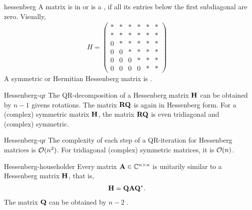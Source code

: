 \begin{Definition}{hessenberg}
  A matrix is in  or is a , if all its entries below the first subdiagonal are zero. Visually,
  \begin{gather}
    H = 
    \begin{pmatrix}
      *&*&*&*&*&*\\
      *&*&*&*&*&*\\
      0&*&*&*&*&*\\
      0&0&*&*&*&*\\
      0&0&0&*&*&*\\
      0&0&0&0&*&*
    \end{pmatrix}
  \end{gather}
  A symmetric or Hermitian Hessenberg matrix is .
\end{Definition}

\begin{Theorem}{Hessenberg-qr}
  The QR-decomposition of a Hessenberg matrix $\mathbf H$ can be obtained
  by $n-1$ givens rotations. The matrix $\mathbf R\mathbf Q$ is again in
  Hessenberg form. For a (complex) symmetric matrix $\mathbf H$, the
  matrix $\mathbf R\mathbf Q$ is even tridiagonal and (complex) symmetric.
\end{Theorem}

\begin{Corollary}{Hessenberg-qr}
  The complexity of each step of a QR-iteration for Hessenberg matrices is $\mathcal O(n^2)$. For tridiagonal (complex) symmetric matrices, it is $\mathcal O(n)$.
\end{Corollary}

\begin{Theorem}{Hessenberg-householder}
  Every matrix $\mathbf A\in\mathbb C^{n\times n}$ is unitarily similar to a Hessenberg matrix $\mathbf H$, that is,
  \begin{gather}
    \mathbf H = \mathbf Q \mathbf A \mathbf Q^*.
  \end{gather}
  The matrix $\mathbf Q$ can be obtained by $n-2$ .
\end{Theorem}

